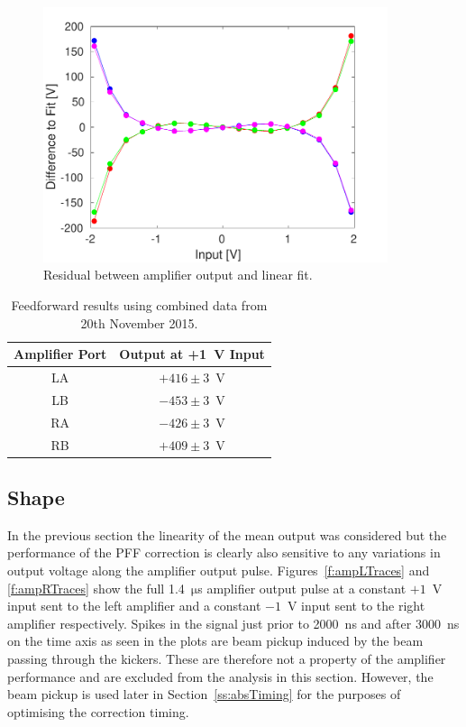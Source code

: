 \begin{figure}
  \centering
  \includegraphics[width=0.9\textwidth]{Figures/commissioning/AmpOutvsDAC_residual}
  \caption{Residual between amplifier output and linear fit.}
  \label{f:AmpOutvsDAC_residual}
\end{figure}

\begin{table}
  \begin{center}
    \begin{tabular}{| c | c |}
	   \hline
       Amplifier Port & Output at +1~V Input \\ \hline
       LA & \(+416\pm3\)~V \\
	   LB & \(-453\pm3\)~V \\
	   RA & \(-426\pm3\)~V \\
	   RB & \(+409\pm3\)~V \\
 	   \hline
    \end{tabular}
    \caption{Feedforward results using combined data from 20th November 2015.}
  	\label{t:AmpOutVsDAC}
  \end{center}
\end{table}

\subsection{Shape}
\label{ss:ampShape}

In the previous section the linearity of the mean output was considered but the performance of the PFF correction is clearly also sensitive to any variations in output voltage along the amplifier output pulse. Figures~\ref{f:ampLTraces} and \ref{f:ampRTraces} show the full 1.4~\(\mathrm{\mu}\)s amplifier output pulse at a constant \(+1\)~V input sent to the left amplifier and a constant \(-1\)~V input sent to the right amplifier respectively. Spikes in the signal just prior to 2000~ns and after 3000~ns on the time axis as seen in the plots are beam pickup induced by the beam passing through the kickers. These are therefore not a property of the amplifier performance and are excluded from the analysis in this section. However, the beam pickup is used later in Section~\ref{ss:absTiming} for the purposes of optimising the correction timing.

